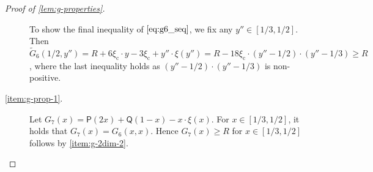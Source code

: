 \documentclass[a4paper,USenglish,cleveref]{lipics-v2019}
\newcommand{\R}{\ensuremath{R}}
\newcommand{\gconst}{\ensuremath{\xi_\mathrm{c}}}
\newcommand{\g}{\ensuremath{\xi}}
\newcommand{\water}{\textsf{Q}}
\newcommand{\cutintegral}{\textsf{P}}
\begin{document}
\begin{proof}[Proof of \cref{lem:g-properties}]
\begin{description}
To show the final inequality of $\eqref{eq:g6_seq}$, 
we fix any $y'' \in [1/3,1/2]$. Then 
$\tilde{G}_6(1/2,y'') 
  = \R + 6 \gconst \cdot y - 3 \gconst + y'' \cdot \g(y'') 
  = \R - 18 \gconst \cdot (y'' - 1/2) \cdot (y''-1/3) 
  \geq \R$,
where the last inequality holds as $(y'' - 1/2) \cdot (y''-1/3)$ is non-positive.

\item[\cref{item:g-prop-1}.]
Let $G_7(x) = \cutintegral(2 x) + \water(1-x) - x \cdot \g(x)$. 
For $x \in [1/3,1/2]$, it holds that $G_7(x) = G_6(x,x)$.
Hence $G_7(x) \geq \R$ for $x \in [1/3,1/2]$ follows by \cref{item:g-2dim-2}.
\qedhere
\end{description}
\end{proof}






\begin{appendix}

\end{appendix}
\end{document}
